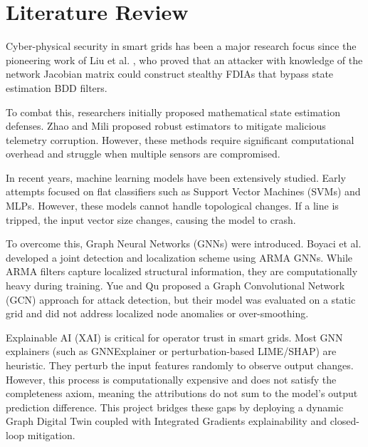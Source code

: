 \documentclass[12pt,a4paper]{report}
\begin{document}
\chapter{Literature Review}
Cyber-physical security in smart grids has been a major research focus since the pioneering work of Liu et al. \cite{b3}, who proved that an attacker with knowledge of the network Jacobian matrix could construct stealthy FDIAs that bypass state estimation BDD filters. 

To combat this, researchers initially proposed mathematical state estimation defenses. Zhao and Mili \cite{b5} proposed robust estimators to mitigate malicious telemetry corruption. However, these methods require significant computational overhead and struggle when multiple sensors are compromised.

In recent years, machine learning models have been extensively studied. Early attempts focused on flat classifiers such as Support Vector Machines (SVMs) and MLPs. However, these models cannot handle topological changes. If a line is tripped, the input vector size changes, causing the model to crash. 

To overcome this, Graph Neural Networks (GNNs) were introduced. Boyaci et al. \cite{b10} developed a joint detection and localization scheme using ARMA GNNs. While ARMA filters capture localized structural information, they are computationally heavy during training. Yue and Qu \cite{b14} proposed a Graph Convolutional Network (GCN) approach for attack detection, but their model was evaluated on a static grid and did not address localized node anomalies or over-smoothing.

Explainable AI (XAI) is critical for operator trust in smart grids. Most GNN explainers (such as GNNExplainer \cite{b15} or perturbation-based LIME/SHAP) are heuristic. They perturb the input features randomly to observe output changes. However, this process is computationally expensive and does not satisfy the completeness axiom, meaning the attributions do not sum to the model's output prediction difference. This project bridges these gaps by deploying a dynamic Graph Digital Twin coupled with Integrated Gradients explainability and closed-loop mitigation.

\end{document}
